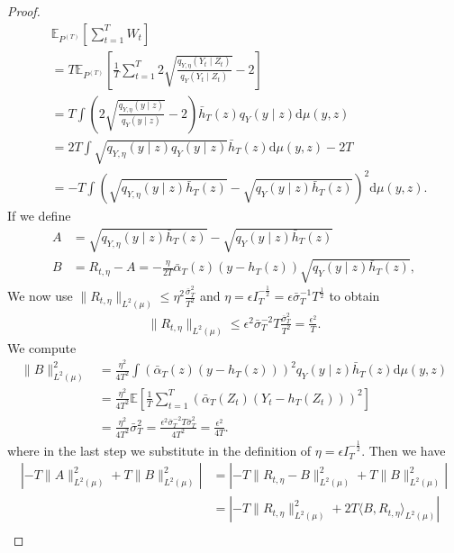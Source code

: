 \documentclass[11pt]{article}
\begin{document}
\begin{proof}
        \begin{align*}
            &\mathbb{E}_{P^{(T)}}\left[\sum_{t=1}^{T}W_t\right]\\
            &= T\mathbb{E}_{P^{(T)}}\left[\frac{1}{T}\sum_{t=1}^{T}2\sqrt{\frac{q_{Y, \eta}(Y_t\mid Z_t)}{q_Y(Y_t\mid Z_t)}} - 2\right]\\
            &= T\int \left(2\sqrt{\frac{q_{Y,\eta}(y\mid z)}{q_Y(y\mid z)}}-2\right)\bar{h}_T(z)q_Y(y\mid z)\mathrm{d}\mu(y,z)\\
            &= 2T \int \sqrt{q_{Y,\eta}(y\mid z)q_Y(y\mid z)}\bar{h}_T(z)\mathrm{d}\mu(y,z)  - 2T\\
            &= - T \int \left(\sqrt{q_{Y,\eta}(y\mid z)\bar{h}_T(z)} - \sqrt{q_Y(y\mid z)\bar{h}_T(z)}\right)^2\mathrm{d}\mu(y,z). 
    \end{align*}
    If we define
    \begin{align*}
        A &= \sqrt{q_{Y,\eta}(y\mid z)\bar{h}_T(z)} - \sqrt{q_Y(y\mid z)\bar{h}_T(z)}\\
        B &= R_{t,\eta} - A = -\frac{\eta}{2T}\bar{\alpha}_T(z)(y - h_T(z))\sqrt{q_Y(y\mid z)\bar{h}_T(z)},
    \end{align*}
    We now use $\|R_{t,\eta}\|_{L^2(\mu)}\leq \eta^2\frac{\bar{\sigma}_T^2}{T^2}$ and $\eta = \epsilon I_T^{-\frac{1}{2}} = \epsilon \bar{\sigma}_T^{-1}T^{\frac{1}{2}}$ to obtain
    \begin{align*}
        \|R_{t,\eta}\|_{L^2(\mu)} \leq \epsilon^2 \bar{\sigma}_T^{-2}T\frac{\bar{\sigma}_T^2}{T^2} = \frac{\epsilon^2}{T}.
    \end{align*}
    We compute
    \begin{align*}
        \|B\|^2_{L^2(\mu)} &= \frac{\eta^2}{4T^2}\int (\bar{\alpha}_T(z)(y - h_T(z)))^2 q_Y(y\mid z)\bar{h}_T(z)\mathrm{d}\mu(y,z)\\
        &= \frac{\eta^2}{4T^2}\mathbb{E}\left[\frac{1}{T}\sum_{t=1}^{T}(\bar{\alpha}_T(Z_t)(Y_t - h_T(Z_t)))^2\right]\\
        &= \frac{\eta^2}{4T^2}\bar{\sigma}_T^2 = \frac{\epsilon^2\bar{\sigma}_T^{-2}T\bar{\sigma}_T^2}{4T^2} = \frac{\epsilon^2}{4T}. 
    \end{align*}
    where in the last step we substitute in the definition of $\eta = \epsilon I_T^{-\frac{1}{2}}$. Then we have
    \begin{align*}
        \left|-T \|A\|^2_{L^2(\mu)} + T\|B\|^2_{L^2(\mu)}\right| &= \left|-T \|R_{t,\eta} - B\|^2_{L^2(\mu)} + T \|B\|^2_{L^2(\mu)}\right|\\
        &= \left|-T\|R_{t,\eta}\|^2_{L^2(\mu)} + 2T\langle B, R_{t,\eta}\rangle_{L^2(\mu)}\right|\\

\end{align*}
\end{proof}
\end{document}
